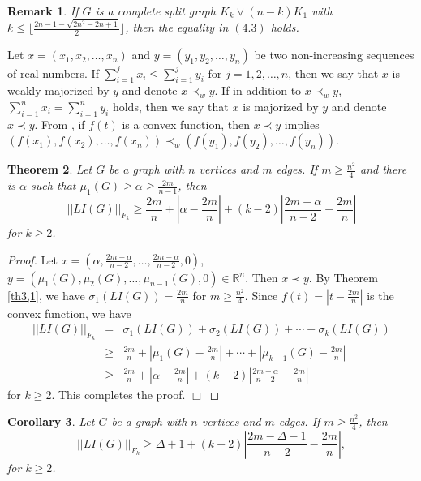 \documentclass[12pt, a4paper]{article}
\newtheorem{theorem}{Theorem}[section]
\newtheorem{corollary}[theorem]{Corollary}
\newtheorem{remark}[theorem]{Remark}
\begin{document}
\begin{remark}
If $G$ is a complete split graph $K_k\vee (n-k)K_1$ with $k\leq \lfloor\frac{2n-1-\sqrt{2n^2-2n+1}}{2}\rfloor$, then the equality in $(4.3)$ holds.
\end{remark}


Let $x=(x_1, x_2, \ldots, x_n)$ and $y=(y_1, y_2, \ldots, y_n)$ be two
non-increasing sequences of real numbers. If
$\sum_{i=1}^{j}x_i\leq \sum_{i=1}^{j}y_i$ for $j=1, 2, \ldots, n$,
then we say that $x$ is weakly majorized by $y$ and denote $x\prec_{w} y$. If in addition
to $x\prec_{w} y$, $\sum_{i=1}^{n}x_i=\sum_{i=1}^{n}y_i$ holds, then we say that $x$ is majorized by $y$
and denote $x\prec y$. From \cite{MO}, if $f(t)$ is a convex function, then $x\prec y$ implies $(f(x_1), f(x_2), \ldots, f(x_n)) \prec_{w} (f(y_1), f(y_2), \ldots, f(y_n))$.


\begin{theorem}\label{th4,7} %
Let $G$ be a graph with $n$ vertices and $m$ edges. If $ m\geq\frac{n^2}{4}$ and there is $\alpha$ such that $\mu_1(G)\geq \alpha\geq \frac{2m}{n-1}$, then
$$||LI(G)||_{F_k} \geq \frac{2m}{n}+\left\lvert \alpha-\frac{2m}{n}\right\lvert+(k-2)\left\lvert\frac{2m-\alpha}{n-2}-\frac{2m}{n}\right\lvert$$
for $k\geq 2$.
\end{theorem}

\begin{proof} Let $x=(\alpha, \frac{2m-\alpha}{n-2}, \ldots, \frac{2m-\alpha}{n-2},0)$, $y=(\mu_1(G), \mu_2(G), \ldots, \mu_{n-1}(G),0)\in \mathbb{R}^{n}$. Then $x\prec y$. By Theorem \ref{th3,1}, we have $\sigma_1(LI(G))= \frac{2m}{n}$ for $ m\geq\frac{n^2}{4}$. Since $f(t)=|t-\frac{2m}{n}|$ is the convex function, we have
\begin{eqnarray*}
||LI(G)||_{F_k} & = & \sigma_1(LI(G))+\sigma_2(LI(G))+\cdots+\sigma_k(LI(G))\\
& \geq & \frac{2m}{n}+\left\lvert \mu_1(G)-\frac{2m}{n}\right\lvert+\cdots+\left\lvert \mu_{k-1}(G)-\frac{2m}{n}\right\lvert\\
& \geq & \frac{2m}{n}+\left\lvert \alpha-\frac{2m}{n}\right\lvert+(k-2)\left\lvert\frac{2m-\alpha}{n-2}-\frac{2m}{n}\right\lvert
\end{eqnarray*}
for $k\geq 2$. This completes the proof. $\Box$
\end{proof}


\begin{corollary}\label{cor4,1} %
Let $G$ be a graph with $n$ vertices and $m$ edges. If $ m\geq\frac{n^2}{4}$, then
$$||LI(G)||_{F_k}\geq  \Delta+1+(k-2)\left\lvert\frac{2m-\Delta-1}{n-2}-\frac{2m}{n}\right\lvert,$$
for $k\geq 2$.
\end{corollary}
\end{document}
